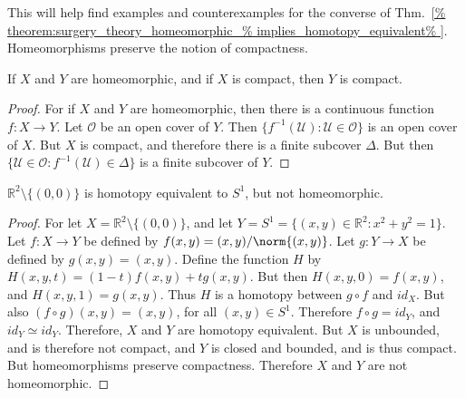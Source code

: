 \documentclass[crop=false,class=book,oneside]{standalone}
\begin{document}
            This will help find examples and counterexamples for
            the converse of Thm.~\ref{%
                theorem:surgery_theory_homeomorphic_%
                implies_homotopy_equivalent%
            }. Homeomorphisms preserve the notion of compactness.
            \begin{theorem}
                If $X$ and $Y$ are homeomorphic, and if
                $X$ is compact, then $Y$ is compact.
            \end{theorem}
            \begin{proof}
                For if $X$ and $Y$ are homeomorphic, then there
                is a continuous function $f:X\rightarrow{Y}$.
                Let $\mathcal{O}$ be an open cover of $Y$.
                Then $\{f^{-1}(\mathcal{U}):\mathcal{U}\in\mathcal{O}\}$
                is an open cover of $X$. But $X$ is compact, and
                therefore there is a finite subcover
                $\Delta$. But then
                $\{\mathcal{U}\in\mathcal{O}:%
                 f^{-1}(\mathcal{U})\in\Delta\}$ is a finite
                subcover of $Y$.
            \end{proof}
            \begin{theorem}
                \label{%
                    theorem:surgery_theory_Homotopy_%
                    equivalance_of_plane_without_point_and_unit_%
                    disc_but_not_homeomorphic%
                }
                $\mathbb{R}^{2}\setminus\{(0,0)\}$ is homotopy
                equivalent to $S^{1}$, but not homeomorphic.
            \end{theorem}
            \begin{proof}
                For let $X=\mathbb{R}^{2}\setminus\{(0,0)\}$,
                and let
                $Y=S^{1}=\{(x,y)\in\mathbb{R}^{2}:x^{2}+y^{2}=1\}$.
                Let $f:{X}\rightarrow{Y}$ be defined by
                $f(x,y)=(x,y)/\norm{(x,y)}$. Let
                $g:{Y}\rightarrow{X}$ be defined by $g(x,y)=(x,y)$.
                Define the function $H$ by
                $H(x,y,t)=(1-t)f(x,y)+tg(x,y)$.
                But then $H(x,y,0)=f(x,y)$,
                and $H(x,y,1)=g(x,y)$. Thus $H$ is a
                homotopy between ${g}\circ{f}$ and $id_{X}$. But also
                $({f}\circ{g})(x,y)=(x,y)$, for all $(x,y)\in S^{1}$.
                Therefore ${f}\circ{g}=id_{Y}$, and
                ${id_{Y}}\simeq{id_{Y}}$. Therefore, $X$ and $Y$ are
                homotopy equivalent. But $X$ is unbounded,
                and is therefore not compact,
                and $Y$ is closed and bounded,
                and is thus compact. But homeomorphisms
                preserve compactness. Therefore $X$ and $Y$ are
                not homeomorphic.
            \end{proof}
\end{document}
